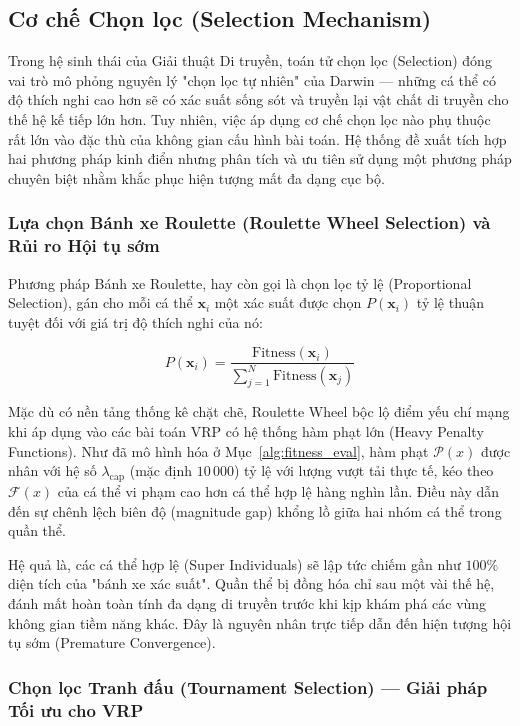 \documentclass[12pt,a4paper]{article}
\numberwithin{figure}{subsection}
\begin{document}
\subsection{Cơ chế Chọn lọc (Selection Mechanism)}

Trong hệ sinh thái của Giải thuật Di truyền, toán tử chọn lọc (Selection) đóng vai trò mô phỏng nguyên lý "chọn lọc tự nhiên" của Darwin — những cá thể có độ thích nghi cao hơn sẽ có xác suất sống sót và truyền lại vật chất di truyền cho thế hệ kế tiếp lớn hơn. Tuy nhiên, việc áp dụng cơ chế chọn lọc nào phụ thuộc rất lớn vào đặc thù của không gian cấu hình bài toán. Hệ thống đề xuất tích hợp hai phương pháp kinh điển nhưng phân tích và ưu tiên sử dụng một phương pháp chuyên biệt nhằm khắc phục hiện tượng mất đa dạng cục bộ.

\subsubsection{Lựa chọn Bánh xe Roulette (Roulette Wheel Selection) và Rủi ro Hội tụ sớm}

Phương pháp Bánh xe Roulette, hay còn gọi là chọn lọc tỷ lệ (Proportional Selection), gán cho mỗi cá thể $\textbf{x}_i$ một xác suất được chọn $P(\textbf{x}_i)$ tỷ lệ thuận tuyệt đối với giá trị độ thích nghi của nó:

\[ P(\textbf{x}_i) = \frac{\text{Fitness}(\textbf{x}_i)}{\sum_{j=1}^{N} \text{Fitness}(\textbf{x}_j)} \]

Mặc dù có nền tảng thống kê chặt chẽ, Roulette Wheel bộc lộ điểm yếu chí mạng khi áp dụng vào các bài toán VRP có hệ thống hàm phạt lớn (Heavy Penalty Functions). Như đã mô hình hóa ở Mục~\ref{alg:fitness_eval}, hàm phạt $\mathcal{P}(x)$ được nhân với hệ số $\lambda_{\text{cap}}$ (mặc định $10\,000$) tỷ lệ với lượng vượt tải thực tế, kéo theo $\mathcal{F}(x)$ của cá thể vi phạm cao hơn cá thể hợp lệ hàng nghìn lần. Điều này dẫn đến sự chênh lệch biên độ (magnitude gap) khổng lồ giữa hai nhóm cá thể trong quần thể. 

Hệ quả là, các cá thể hợp lệ (Super Individuals) sẽ lập tức chiếm gần như $100\%$ diện tích của "bánh xe xác suất". Quần thể bị đồng hóa chỉ sau một vài thế hệ, đánh mất hoàn toàn tính đa dạng di truyền trước khi kịp khám phá các vùng không gian tiềm năng khác. Đây là nguyên nhân trực tiếp dẫn đến hiện tượng hội tụ sớm (Premature Convergence).

\subsubsection{Chọn lọc Tranh đấu (Tournament Selection) — Giải pháp Tối ưu cho VRP}
\end{document}

